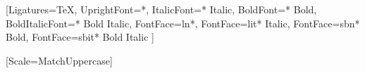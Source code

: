 \usepackage[margin=0.5in]{geometry}

\usepackage{fontspec}
\setmainfont{Times New Roman}
  [Ligatures=TeX,
   UprightFont=*,
   ItalicFont={* Italic},
   BoldFont={* Bold},
   BoldItalicFont={* Bold Italic},
   FontFace={l}{n}{*},
   FontFace={l}{it}{* Italic},
   FontFace={sb}{n}{* Bold},
   FontFace={sb}{it}{* Bold Italic}
  ]
\DeclareRobustCommand{\ltseries}{\fontseries{l}\selectfont}
\DeclareTextFontCommand{\textlt}{\ltseries}
\DeclareRobustCommand{\sbseries}{\fontseries{sb}\selectfont}
\DeclareTextFontCommand{\textsb}{\sbseries}

\setmonofont{Source Code Pro}[Scale=MatchUppercase]

\usepackage[dvipsnames]{xcolor}

\usepackage{titling}
\setlength{\droptitle}{-3.5em}
\pretitle{\begin{center}\rmfamily\bfseries\color{themecolour}}
\posttitle{\par\end{center}\vspace{-2em}}
\preauthor{}
\author{}
\postauthor{}
\predate{}
\date{}
\postdate{}

\setlength{\defaultparindent}{\parindent}
\setlength{\parindent}{0em}
\setlength{\defaultparskip}{\parskip}
\setlength{\parskip}{1ex}

\usepackage[titles]{tocloft}
\setlength{\cftaftertoctitleskip}{1\parskip}
\setlength{\cftbeforesecskip}{0.5\parskip}
\setlength{\cftsecindent}{0pt}
\setlength{\cftsubsecindent}{1.5em}
\setlength{\cftsubsubsecindent}{1.5em}
\renewcommand{\cfttoctitlefont}{\LARGE\rmfamily\bfseries\color{themecolour}}
\renewcommand{\cftsecfont}{\normalsize\rmfamily}
\renewcommand{\cftsecpagefont}{\normalsize\rmfamily}
\renewcommand{\cftsubsecfont}{\normalsize\rmfamily\ltseries}
\renewcommand{\cftsubsecpagefont}{\normalsize\rmfamily\ltseries}
\renewcommand{\cftsubsubsecfont}{\normalsize\rmfamily\ltseries\itshape}
\renewcommand{\cftsubsubsecpagefont}{\normalsize\rmfamily\ltseries\itshape}

